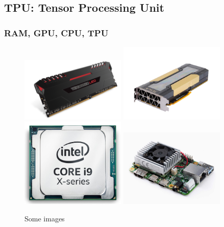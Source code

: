\documentclass[11pt]{beamer}
\begin{document}
\subsection{TPU: Tensor Processing Unit}
\begin{frame}
	\frametitle{RAM, GPU, CPU, TPU}
	\begin{figure}
		\includegraphics[width=50mm,scale=0.5]{ram5}\hspace{2mm}
		\includegraphics[width=50mm,scale=0.5]{v100}
		\\[\smallskipamount]
		\includegraphics[width=50mm,scale=0.5]{cpu2}\hspace{2mm}
		\includegraphics[width=50mm,scale=0.5]{tpu}
		\caption{Some images}\label{fig:foobar}
	\end{figure}
\end{frame}
\end{document}
